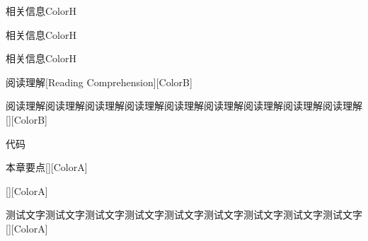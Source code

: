 \documentclass[color=green]{textbook-cn}%
\newlength{\la}\newlength{\lb}\newlength{\lc}\newlength{\ld}
\begin{document}
\begin{Project}
\begin{box7}{相关信息}{ColorH}{\faCommentDots}
	\lipsum[3]
\end{box7}

\begin{Paracol}
\begin{box7}{相关信息}{ColorH}{\faCommentDots}
	\lipsum[3]
\end{box7}
\switchcolumn
\begin{box7}{相关信息}{ColorH}{\faCommentDots}
	\lipsum[3][1-2]
\end{box7}

\end{Paracol}



\begin{box9}{阅读理解}[Reading Comprehension][ColorB]
\lipsum
\end{box9}


\begin{box9}{阅读理解阅读理解阅读理解阅读理解阅读理解阅读理解阅读理解阅读理解阅读理解}[][ColorB]
	\lipsum
\end{box9}




\begin{Vocabulary}
	\lipsum[2]
	\lipsum[2]
\end{Vocabulary}




\begin{PythonBox}{代码}
	
\end{PythonBox}



\begin{box0}[left=0mm]{本章要点}[][ColorA]
\lipsum[3]
\end{box0}

\begin{box0}[left=0mm]{ }[][ColorA]
	\lipsum[3]
\end{box0}

\begin{box0}[left=0mm]{测试文字测试文字测试文字测试文字测试文字测试文字测试文字测试文字测试文字}[][ColorA]
	\lipsum[3]
\end{box0}



\begin{Exercise}
\lipsum[2]
\end{Exercise}


\Example{\lipsum[2]}



\begin{Proof}
	\lipsum[2]
\end{Proof}





\makeatother

\end{Project}
\end{document}
